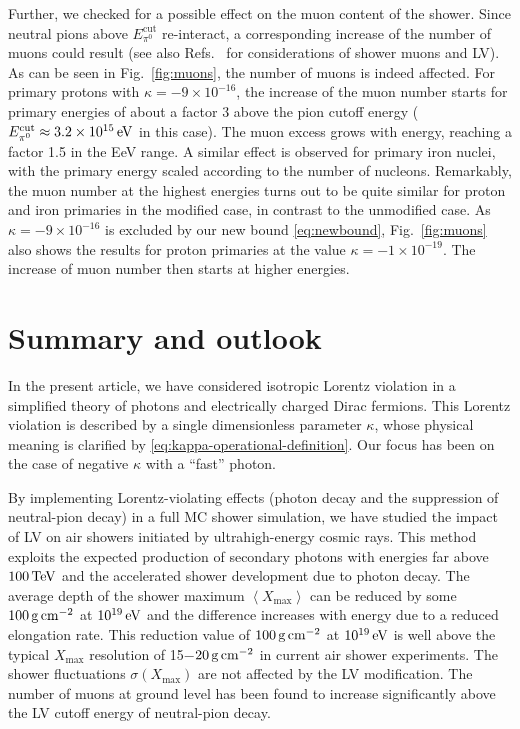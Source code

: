 \documentclass[aps,prd,preprint,longbibliography]{revtex4-1}
\begin{document}
Further, we checked for a possible effect on the muon content of the shower.
Since neutral pions above $E^\text{cut}_{\pi^{0}}$
re-interact,  a corresponding
increase of the number of muons could result
(see also Refs.~\cite{Tomar2017,Boncioli-etal2015}
for considerations of shower muons and LV).
As can be seen in Fig.~\ref{fig:muons},
the number of muons is indeed affected. For primary protons with
$\kappa = -9 \times 10^{-16}$,
the increase of the muon number starts
for primary energies of about a factor
$3$ above the pion cutoff energy
($E^\text{cut}_{\pi^{0}} \approx  \unit[3.2\times10^{15}]{eV}$ in this case).  The muon excess grows with energy, reaching a factor 1.5 in the EeV range.
A similar effect is observed for primary iron nuclei,
with the primary energy
scaled according to the number of nucleons.
Remarkably, the muon number at the highest energies
turns out to be quite similar for proton and
iron primaries in the modified case, in contrast to the unmodified case.
As $\kappa = -9 \times 10^{-16}$ is excluded by
our new bound \eqref{eq:newbound}, Fig.~\ref{fig:muons} also shows the
results for proton primaries at the value $\kappa = -1 \times 10^{-19}$.
The increase of muon number then starts at higher energies.



\vspace*{-5mm}
\section{Summary and outlook}
\label{sec:outlook}
\vspace*{-2mm}


In the present article,
we have considered isotropic
Lorentz violation in a simplified theory of
photons and electrically charged Dirac fermions.
This Lorentz violation is described by a single
dimensionless parameter $\kappa$, whose physical
meaning is clarified by \eqref{eq:kappa-operational-definition}.
Our focus has been on the case of negative $\kappa$ with a ``fast'' photon.

By implementing Lorentz-violating effects
(photon decay and the suppression of neutral-pion decay)
in a full MC shower simulation, we have studied the impact of LV
on air showers initiated by ultrahigh-energy cosmic rays.
This method exploits the expected production of secondary photons with
energies far above $\unit[100]{TeV}$ and the accelerated shower development due to photon decay.
The average depth of the shower maximum $\left<X_\text{max}\right>$
can be reduced by some $\unit[100]{g\,cm^{-2}}$ at $\unit[10^{19}]{eV}$
and the difference increases with
energy due to a reduced elongation rate. This
reduction value of $\unit[100]{g\,cm^{-2}}$ at $\unit[10^{19}]{eV}$
is well above the
typical $X_\text{max}$ resolution of 15$-$$\unit[20]{g\,cm^{-2}}$
in current air shower experiments.
The shower fluctuations $\sigma(X_\text{max})$ are not affected by the
LV modification.
The number of muons at ground level
has been found to increase significantly above the LV cutoff energy of
neutral-pion decay.
\end{document}
